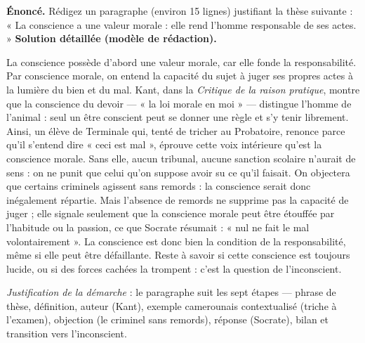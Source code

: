 \documentclass[11pt]{article}
\newcommand{\cle}[1]{{\popxbold\color{popdark}#1}}
\begin{document}
\begin{exoresolu}
\textbf{Énoncé.} Rédigez un paragraphe (environ 15 lignes) justifiant la thèse suivante : « La conscience a une valeur morale : elle rend l'homme responsable de ses actes. »
\tcblower
\textbf{Solution détaillée (modèle de rédaction).}

La conscience possède d'abord une \cle{valeur morale}, car elle fonde la \cle{responsabilité}. Par conscience morale, on entend la capacité du sujet à juger ses propres actes à la lumière du bien et du mal. Kant, dans la \emph{Critique de la raison pratique}, montre que la conscience du devoir — « la loi morale en moi » — distingue l'homme de l'animal : seul un être conscient peut se donner une règle et s'y tenir librement. Ainsi, un élève de Terminale qui, tenté de tricher au Probatoire, renonce parce qu'il s'entend dire « ceci est mal », éprouve cette voix intérieure qu'est la conscience morale. Sans elle, aucun tribunal, aucune sanction scolaire n'aurait de sens : on ne punit que celui qu'on suppose avoir su ce qu'il faisait. On objectera que certains criminels agissent sans remords : la conscience serait donc inégalement répartie. Mais l'absence de remords ne supprime pas la capacité de juger ; elle signale seulement que la conscience morale peut être étouffée par l'habitude ou la passion, ce que Socrate résumait : « nul ne fait le mal volontairement ». La conscience est donc bien la condition de la responsabilité, même si elle peut être défaillante. Reste à savoir si cette conscience est toujours lucide, ou si des forces cachées la trompent : c'est la question de l'inconscient.

\emph{Justification de la démarche} : le paragraphe suit les sept étapes — phrase de thèse, définition, auteur (Kant), exemple camerounais contextualisé (triche à l'examen), objection (le criminel sans remords), réponse (Socrate), bilan et transition vers l'inconscient.
\end{exoresolu}
\end{document}
